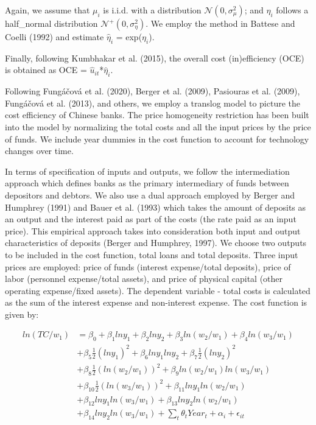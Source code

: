 \documentclass[
  12pt,
  a4paper,
]{scrreprt}
\begin{document}
Again, we assume that \(\mu_{i}\) is i.i.d. with a distribution
\(\mathcal{N}(0,\sigma_{\mu}^{2})\); and \(\eta_{i}\) follows a
half\_normal distribution \(\mathcal{N}^{+}(0,\sigma_{\eta}^{2})\). We
employ the method in Battese and Coelli (1992) and estimate
\(\hat \eta_{i}\) = exp(\(\eta_{i}\)).

Finally, following Kumbhakar et al. (2015), the overall cost
(in)efficiency (OCE) is obtained as OCE =
\(\hat u_{it}\)*\(\hat \eta_{i}\).

Following Fungáčová et al. (2020), Berger et al. (2009), Pasiouras et
al. (2009), Fungáčová et al. (2013), and others, we employ a translog
model to picture the cost efficiency of Chinese banks. The price
homogeneity restriction has been built into the model by normalizing the
total costs and all the input prices by the price of funds. We include
year dummies in the cost function to account for technology changes over
time.

In terms of specification of inputs and outputs, we follow the
intermediation approach which defines banks as the primary intermediary
of funds between depositors and debtors. We also use a dual approach
employed by Berger and Humphrey (1991) and Bauer et al. (1993) which
takes the amount of deposits as an output and the interest paid as part
of the costs (the rate paid as an input price). This empirical approach
takes into consideration both input and output characteristics of
deposits (Berger and Humphrey, 1997). We choose two outputs to be
included in the cost function, total loans and total deposits. Three
input prices are employed: price of funds (interest expense/total
deposits), price of labor (personnel expense/total assets), and price of
physical capital (other operating expense/fixed assets). The dependent
variable - total costs is calculated as the sum of the interest expense
and non-interest expense. The cost function is given by:

\begin{equation}
\begin{aligned}
ln(TC/w_{1}) 
&= \beta_{0} + \beta_{1}lny_{1} + \beta_{2}lny_{2} + \beta_{3}ln(w_{2}/w_{1}) + \beta_{4}ln(w_{3}/w_{1}) \\
&+ \beta_{5}\frac{1}{2}(lny_{1})^2 + \beta_{6}lny_{1}lny_{2} + \beta_{7}\frac{1}{2}(lny_{2})^2 \\ &+ \beta_{8}\frac{1}{2}(ln(w_{2}/w_{1}))^2 + \beta_{9}ln(w_{2}/w_{1})ln(w_{3}/w_{1}) \\
&+ \beta_{10}\frac{1}{2}(ln(w_{3}/w_{1}))^2 + \beta_{11}lny_{1}ln(w_{2}/w_{1}) \\
&+ \beta_{12}lny_{1}ln(w_{3}/w_{1}) + \beta_{13}lny_{2}ln(w_{2}/w_{1}) \\
&+ \beta_{14}lny_{2}ln(w_{3}/w_{1}) + \sum_{t}\theta_{t}Year_{t} + \alpha_{i} + \epsilon_{it}
\end{aligned}
\end{equation}
\end{document}
